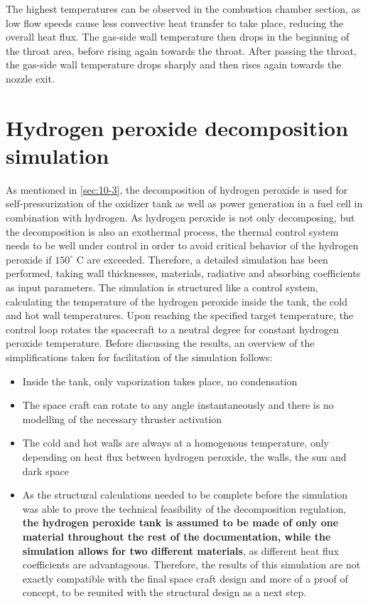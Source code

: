 The highest temperatures can be observed in the combustion chamber section, as low flow speeds cause less convective heat transfer to take place, reducing the overall heat flux. The gas-side wall temperature then drops in the beginning of the throat area, before rising again towards the throat. After passing the throat, the gas-side wall temperature drops sharply and then rises again towards the nozzle exit.
\clearpage
\section{Hydrogen peroxide decomposition simulation}
\label{sec:11-3}
\qquad As mentioned in \autoref{sec:10-3}, the decomposition of hydrogen peroxide is used for self-pressurization of the oxidizer tank as well as power generation in a fuel cell in combination with hydrogen. As hydrogen peroxide is not only decomposing, but the decomposition is also an exothermal process, the thermal control system needs to be well under control in order to avoid critical behavior of the hydrogen peroxide if $150^\circ$ C are exceeded. Therefore, a detailed simulation has been performed, taking wall thicknesses, materials, radiative and absorbing coefficients as input parameters. The simulation is structured like a control system, calculating the temperature of the hydrogen peroxide inside the tank, the cold and hot wall temperatures. Upon reaching the specified target temperature, the control loop rotates the spacecraft to a neutral degree for constant hydrogen peroxide temperature. Before discussing the results, an overview of the simplifications taken for facilitation of the simulation follows:
\begin{itemize}
	\itemsep0em 
	\item	Inside the tank, only vaporization takes place, no condensation
	\item	The space craft can rotate to any angle instantaneously and there is no modelling of the necessary thruster activation
	\item	The cold and hot walls are always at a homogenous temperature, only depending on heat flux between hydrogen peroxide, the walls, the sun and dark space
	\item	As the structural calculations needed to be complete before the simulation was able to prove the technical feasibility of the decomposition regulation, \textbf{the hydrogen peroxide tank is assumed to be made of only one material throughout the rest of the documentation, while the simulation allows for two different materials}, as different heat flux coefficients are advantageous. Therefore, the results of this simulation are not exactly compatible with the final space craft design and more of a proof of concept, to be reunited with the structural design as a next step.
\end{itemize}

